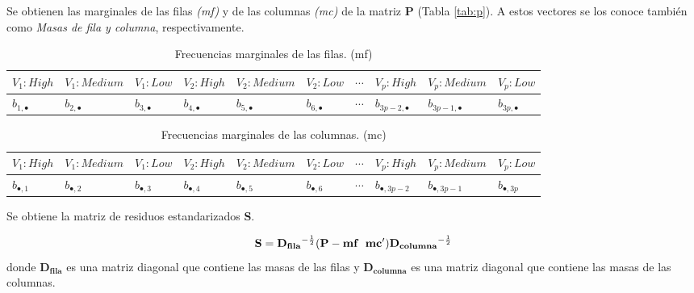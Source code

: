 \documentclass[mathematics,article,submit,moreauthors,pdftex]{mdpi}
\begin{document}
Se obtienen las marginales de las filas \emph{(mf)} y de las columnas
\emph{(mc)} de la matriz \textbf{P} (Tabla \ref{tab:p}). A estos
vectores se los conoce también como \emph{Masas de fila y columna},
respectivamente.

\begin{table}[!ht]
\begin{center}
 \begin{tabular}{||p{1cm}p{1cm}p{1cm}||p{1cm}p{1cm} p{1cm} ||p{1cm} ||p{1cm} p{1cm} p{1cm} ||} 
 \hline
 $V_{1}:High$ &$V_{1}:Medium$ &$V_{1}:Low$ & $V_{2}:High$ & $V_{2}:Medium$ & $V_{2}:Low$ & $\cdots$ & $V_{p}:High$ & $V_{p}:Medium$ & $V_{p}:Low$ \\ [0.5ex] 
 \hline
    $b_{1,\bullet}$ & $b_{2, \bullet}$ & $b_{3, \bullet}$ & $b_{4, \bullet}$ & $b_{5, \bullet}$ & $b_{6, \bullet}$ & $\cdots$ & $b_{3p-2, \bullet}$ & $b_{3p-1,\bullet}$ & $b_{3p, \bullet}$ \\ [0.5ex] 
 \hline
\end{tabular}
\caption{Frecuencias marginales de las filas. (mf)}
\label{tab:margfilas}
\end{center}
\end{table}

\begin{table}[h!]
\begin{center}
 \begin{tabular}{||p{1cm}p{1cm}p{1cm}||p{1cm}p{1cm} p{1cm} ||p{1cm} ||p{1cm} p{1cm} p{1cm} ||} 
 \hline
 $V_{1}:High$ &$V_{1}:Medium$ &$V_{1}:Low$ & $V_{2}:High$ & $V_{2}:Medium$ & $V_{2}:Low$ & $\cdots$ & $V_{p}:High$ & $V_{p}:Medium$ & $V_{p}:Low$ \\ [0.5ex] 
 \hline
    $b_{\bullet,1}$ & $b_{\bullet,2}$ & $b_{\bullet,3}$ & $b_{\bullet,4}$ & $b_{\bullet,5}$ & $b_{\bullet,6}$ & $\cdots$ & $b_{\bullet,3p-2}$ & $b_{\bullet,3p-1}$ & $b_{\bullet,3p}$ \\ [0.5ex] 
 \hline
\end{tabular}
\caption{Frecuencias marginales de las columnas. (mc)}
\label{tab:margcolumnas}
\end{center}
\end{table}

Se obtiene la matriz de residuos estandarizados \textbf{S}.

\begin{equation}
\mathbf{S}=\mathbf{D_{fila}}^{-\frac{1}{2}}(\mathbf{P}-\mathbf{mf} \hspace{0.2cm} \mathbf{mc'})\mathbf{D_{columna}}^{-\frac{1}{2}}
\label{eq:s}
\end{equation} donde \(\mathbf{D_{fila}}\) es una matriz diagonal que
contiene las masas de las filas y \(\mathbf{D_{columna}}\) es una matriz
diagonal que contiene las masas de las columnas.
\end{document}
